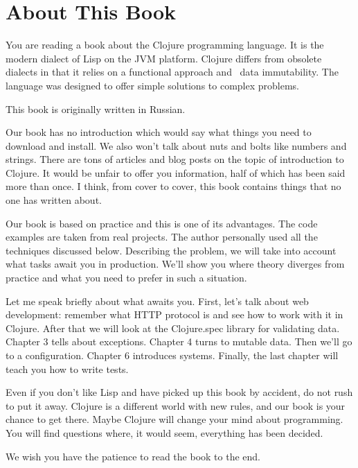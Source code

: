 
\section*{About This Book}

You are reading a book about the Clojure programming language. It is the modern dialect of Lisp on the JVM platform. 
Clojure differs from obsolete dialects in that it relies on a functional approach and ~data immutability. 
The language was designed to offer simple solutions to complex problems.

This book is originally written in Russian.

Our book has no introduction which would say what things you need to download and install.
We also won't talk about nuts and bolts like numbers and strings. 
There are tons of articles and blog posts on the topic of introduction to Clojure. 
It would be unfair to offer you information, half of which has been said more than once. 
I think, from cover to cover, this book contains things that no one has written about. 

Our book is based on practice and this is one of its advantages. The code examples are taken from real projects. 
The author personally used all the techniques discussed below. Describing the problem, we will take into account what tasks await you in production. 
We'll show you where theory diverges from practice and what you need to prefer in such a situation.

Let me speak briefly about what awaits you. First, let's talk about web development: remember what HTTP protocol is and see how to work with it in Clojure. 
After that we will look at the Clojure.spec library for validating data. 
Chapter 3 tells about exceptions. Chapter 4 turns to mutable data.
Then we'll go to a configuration. Chapter 6 introduces systems. Finally, the last chapter will teach you how to write tests.

Even if you don't like Lisp and have picked up this book by accident, do not rush to put it away. 
Clojure is a different world with new rules, and our book is your chance to get there. 
Maybe Clojure will change your mind about programming. You will find questions where, it would seem, everything has been decided.

We wish you have the patience to read the book to the end.


